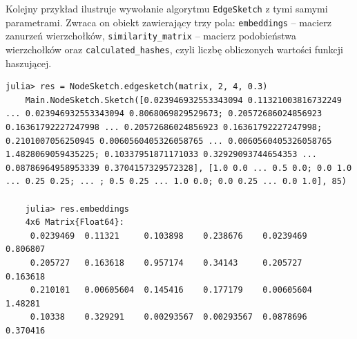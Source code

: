 Kolejny przykład ilustruje wywołanie algorytmu \texttt{EdgeSketch} z tymi samymi parametrami. Zwraca on obiekt zawierający trzy pola: \texttt{embeddings} -- macierz zanurzeń wierzchołków, \texttt{similarity\_matrix} -- macierz podobieństwa wierzchołków oraz \texttt{calculated\_hashes}, czyli liczbę obliczonych wartości funkcji haszującej. 

\begin{lstlisting}[basicstyle=\footnotesize]
    julia> res = NodeSketch.edgesketch(matrix, 2, 4, 0.3)
    Main.NodeSketch.Sketch([0.023946932553343094 0.11321003816732249 ... 0.023946932553343094 0.8068069829529673; 0.20572686024856923 0.16361792227247998 ... 0.20572686024856923 0.16361792227247998; 0.2101007056250945 0.0060560405326058765 ... 0.0060560405326058765 1.4828069059435225; 0.10337951871171033 0.32929093744654353 ... 0.08786964958953339 0.3704157329572328], [1.0 0.0 ... 0.5 0.0; 0.0 1.0 ... 0.25 0.25; ... ; 0.5 0.25 ... 1.0 0.0; 0.0 0.25 ... 0.0 1.0], 85)

    julia> res.embeddings
    4x6 Matrix{Float64}:
     0.0239469  0.11321     0.103898    0.238676    0.0239469   0.806807
     0.205727   0.163618    0.957174    0.34143     0.205727    0.163618
     0.210101   0.00605604  0.145416    0.177179    0.00605604  1.48281
     0.10338    0.329291    0.00293567  0.00293567  0.0878696   0.370416
\end{lstlisting}
    